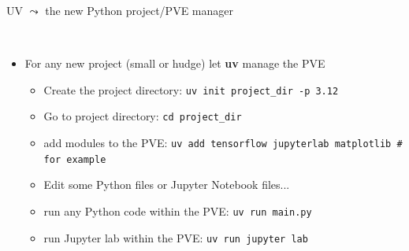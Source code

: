 \documentclass[11pt, serif, mathserif, compress]{beamer}  %
\begin{document}
\begin{frame}[fragile]{UV $\leadsto$ the new Python project/PVE manager}
  
  \begin{bclogo}[noborder=true, couleur=gray!20, couleurBarre=Chocolate, logo=\raisebox{1mm}{\,\huge⚙}, marge=0, margeG=-0.6, margeD=-0.6,]
    {\ }
    \smallskip

    \begin{itemize}\setlength\itemsep{3mm}
    \item<2-> For any new project (small or hudge) let {\bf uv} manage the PVE
      \begin{itemize}\setlength\itemsep{2mm}        
      \item<3-> Create the project directory: \texttt{uv init project_dir -p 3.12}
      \item<4-> Go to project directory: \texttt{cd project_dir}
      \item<5-> add modules to the PVE: \texttt{uv add tensorflow jupyterlab matplotlib  # for example}
      \item<6-> Edit some Python files or Jupyter Notebook files...
      \item<7-> run any Python code within the PVE: \texttt{uv run main.py}
      \item<8-> run Jupyter lab within the PVE: \texttt{uv run jupyter lab}
      \end{itemize}
      
    \end{itemize}
  \end{bclogo}

\end{frame}
\end{document}
